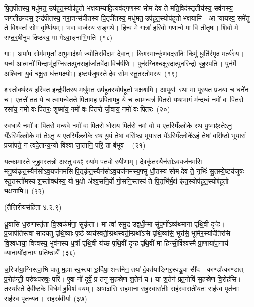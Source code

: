 पि॒तृपी॑तस्य॒ मधु॑मत॒ उप॑हूत॒स्योप॑हूतो भक्षयाम्यादि॒त्यव॑द्गणस्य सोम देव ते मति॒विद॑स्तृ॒तीय॑स्य॒ सव॑नस्य॒ जग॑तीछन्दस॒ इन्द्र॑पीतस्य॒ नरा॒शꣳस॑पीतस्य पि॒तृपी॑तस्य॒ मधु॑मत॒ उप॑हूत॒स्योप॑हूतो भक्षयामि। आ प्या॑यस्व॒ समे॑तु ते वि॒श्वतः॑ सोम॒ वृष्णि॑यम्। भवा॒ वाज॑स्य सङ्ग॒थे। हिन्व॑ मे॒ गात्रा॑ हरिवो ग॒णान्मे॒ मा वि ती॑तृषः। शि॒वो मे॑ सप्त॒र्॒\mbox{}षीनुप॑ तिष्ठस्व॒ मा मे\-ऽवा॒ङ्नाभि॒मति॑~(१८)

गाः। अपा॑म॒ सोम॑म॒मृता॑ अभू॒माद॑र्श्म॒ ज्योति॒रवि॑दाम दे॒वान्। किम॒स्मान्कृ॑णव॒दरा॑तिः॒ किमु॑ धू॒र्तिर॑मृत॒ मर्त्य॑स्य। यन्म॑ आ॒त्मनो॑ मि॒न्दाभू॑द॒ग्निस्तत्पुन॒राहा᳚र्जा॒तवे॑दा॒ विच॑र्\mbox{}षणिः। पुन॑र॒ग्निश्चक्षु॑रदा॒त्पुन॒रिन्द्रो॒ बृह॒स्पतिः॑। पुन॑र्मे अश्विना यु॒वं चक्षु॒रा ध॑त्तम॒क्ष्योः। इ॒ष्टय॑जुषस्ते देव सोम स्तु॒तस्तो॑मस्य~(१९)

श॒स्तोक्थ॑स्य॒ हरि॑वत॒ इन्द्र॑पीतस्य॒ मधु॑मत॒ उप॑हूत॒स्योप॑हूतो भक्षयामि। आ॒पूर्याः॒ स्था मा॑ पूरयत प्र॒जया॑ च॒ धने॑न च। ए॒तत्ते॑ तत॒ ये च॒ त्वामन्वे॒तत्ते॑ पितामह प्रपितामह॒ ये च॒ त्वामन्वत्र॑ पितरो यथाभा॒गं म॑न्दध्वं॒ नमो॑ वः पितरो॒ रसा॑य॒ नमो॑ वः पितरः॒ शुष्मा॑य॒ नमो॑ वः पितरो जी॒वाय॒ नमो॑ वः पितरः~(२०)

स्व॒धायै॒ नमो॑ वः पितरो म॒न्यवे॒ नमो॑ वः पितरो घो॒राय॒ पित॑रो॒ नमो॑ वो॒ य ए॒तस्मिँ॑ल्लो॒के स्थ यु॒ष्माꣴस्ते\-ऽनु॒ ये᳚\-ऽस्मिँल्लो॒के मां ते\-ऽनु॒ य ए॒तस्मिँ॑ल्लो॒के स्थ यू॒यं तेषां॒ वसि॑ष्ठा भूयास्त॒ ये᳚\-ऽस्मिँल्लो॒के॑\-ऽहं तेषां॒ वसि॑ष्ठो भूयासं॒ प्रजा॑पते॒ न त्वदे॒तान्य॒न्यो विश्वा॑ जा॒तानि॒ परि॒ ता ब॑भूव।~(२१)

यत्का॑मास्ते जुहु॒मस्तन्नो॑ अस्तु व॒यꣴ स्या॑म॒ पत॑यो रयी॒णाम्। दे॒वकृ॑त॒स्यैन॑सो\-ऽव॒यज॑नमसि मनु॒ष्य॑कृत॒स्यैन॑सो\-ऽ\-व॒यज॑नमसि पि॒तृकृ॑त॒स्यैन॑सो\-ऽव॒यज॑नमस्य॒फ्सु धौ॒तस्य॑ सोम देव ते॒ नृभिः॑ सु॒तस्ये॒ष्टय॑जुषः स्तु॒तस्तो॑मस्य श॒स्तोक्थ॑स्य॒ यो भ॒क्षो अ॑श्व॒सनि॒र्यो गो॒सनि॒स्तस्य॑ ते पि॒तृभि॑र्भ॒क्षं कृ॑त॒स्योप॑हूत॒स्योप॑हूतो भक्षयामि॥~(२२)

\centerline{\scriptsize (तैत्तिरीयसंहिता ४.२.९)}


ध्रु॒वासि॑ ध॒रुणास्तृ॑ता वि॒श्वक॑र्मणा॒ सुकृ॑ता। मा त्वा॑ समु॒द्र उद्व॑धी॒न्मा सु॑प॒र्णो\-ऽव्य॑थमाना पृथि॒वीं दृꣳ॑ह। प्र॒जा\-प॑तिस्त्वा सादयतु पृथि॒व्याः पृ॒ष्ठे व्यच॑स्वती॒म्प्रथ॑स्वती॒म्प्रथो॑\-ऽसि पृथि॒व्य॑सि॒ भूर॑सि॒ भूमि॑र॒स्यदि॑तिरसि वि॒श्वधा॑या॒ विश्व॑स्य॒ भुव॑नस्य ध॒र्त्री पृ॑थि॒वीं य॑च्छ पृथि॒वीं दृꣳ॑ह पृथि॒वीं मा हिꣳ॑सी॒र्विश्व॑स्मै प्रा॒णाया॑पा॒नाय॑ व्या॒नायो॑दा॒नाय॑ प्रति॒ष्ठायै᳚~(३६)

च॒रित्रा॑या॒ग्निस्त्वा॒भि पा॑तु म॒ह्या स्व॒स्त्या छ॒र्दिषा॒ शन्त॑मेन॒ तया॑ दे॒वत॑याङ्गिर॒स्वद्ध्रु॒वा सी॑द। काण्डा᳚त्काण्डात् प्र॒रोह॑न्ती॒ परु॑षःपरुषः॒ परि॑। ए॒वा नो॑ दूर्वे॒ प्र त॑नु स॒हस्रे॑ण श॒तेन॑ च। या श॒तेन॑ प्रत॒नोषि॑ स॒हस्रे॑ण वि॒रोह॑सि। तस्या᳚स्ते देवीष्टके वि॒धेम॑ ह॒विषा॑ व॒यम्। अषा॑ढासि॒ सह॑माना॒ सह॒स्वारा॑तीः॒ सह॑स्वारातीय॒तः सह॑स्व॒ पृत॑नाः॒ सह॑स्व पृतन्य॒तः। स॒हस्र॑वीर्या~(३७)

